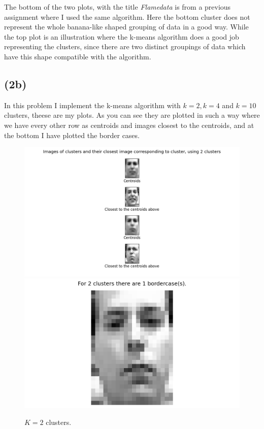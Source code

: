 \documentclass[12pt, letterpaper]{article}
\begin{document}
      The bottom of the two plots, with the title \textit{Flamedata} is from a previous assignment where I used the same algorithm. Here the bottom cluster does not represent the whole banana-like shaped grouping of data in a good way. While the top plot is an illustration where the k-means algorithm does a good job representing the clusters, since there are two distinct groupings of data which have this shape compatible with the algorithm.
    \subsection*{(2b)}
      In this problem I implement the k-means algorithm with $k = 2, k = 4$ and $k = 10$ clusters, theese are my plots. As you can see they are plotted in such a way where we have every other row as centroids and images closest to the centroids, and at the bottom I have plotted the border cases.
      \begin{figure}[H]
        \caption{$K = 2$ clusters.}
        \centering
        \includegraphics[scale=0.7]{cluster2}
        \includegraphics[scale=0.4]{border2}
      \end{figure}
\end{document}
